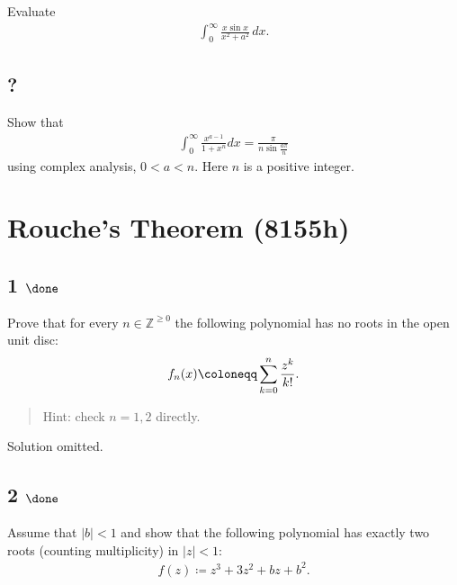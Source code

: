Evaluate
\begin{align*}
\displaystyle{ \int_{0}^{\infty}\frac{x\sin x}{x^2+a^2} \, dx }
.\end{align*}

\hypertarget{section-14}{%
\subsection{?}\label{section-14}}

Show that
\begin{align*}
\displaystyle \int_0^\infty \frac{x^{a-1}}{1+x^n} dx=\frac{\pi}{n\sin \frac{a\pi}{n}}
\end{align*}
using complex analysis, \(0< a < n\). Here \(n\) is a positive integer.

\hypertarget{rouches-theorem-8155h}{%
\section{Rouche's Theorem (8155h)}\label{rouches-theorem-8155h}}

\hypertarget{done-8}{%
\subsection{\texorpdfstring{1
\(\done\)}{1 \textbackslash done}}\label{done-8}}

Prove that for every \(n\in {\mathbb{Z}}^{\geq 0}\) the following
polynomial has no roots in the open unit disc:
\begin{align*}
f_n(x) \coloneqq\sum_{k=0}^n {z^k \over k!}
.\end{align*}

\begin{quote}
Hint: check \(n=1,2\) directly.
\end{quote}

Solution omitted.

\hypertarget{done-9}{%
\subsection{\texorpdfstring{2
\(\done\)}{2 \textbackslash done}}\label{done-9}}

Assume that \({\left\lvert {b} \right\rvert} < 1\) and show that the
following polynomial has exactly two roots (counting multiplicity) in
\({\left\lvert {z} \right\rvert} < 1\):
\begin{align*}
f(z) \coloneqq z^3 + 3z^2 + bz + b^2
.\end{align*}

